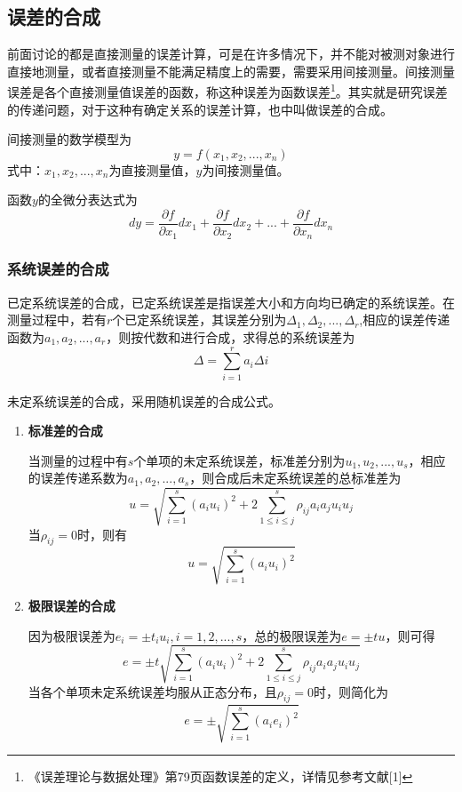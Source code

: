 \subsection{误差的合成}
前面讨论的都是直接测量的误差计算，可是在许多情况下，并不能对被测对象进行直接地测量，或者直接测量不能满足精度上的需要，需要采用间接测量。间接测量误差是各个直接测量值误差的函数，称这种误差为函数误差\footnote{《误差理论与数据处理》第79页函数误差的定义，详情见参考文献[1]}。其实就是研究误差的传递问题，对于这种有确定关系的误差计算，也中叫做误差的合成。

间接测量的数学模型为\begin{equation} y=f(x_1,x_2,...,x_n) \end{equation}
式中：$ x_1,x_2,...,x_n $为直接测量值，$ y $为间接测量值。

函数$ y $的全微分表达式为\begin{equation} dy=\frac{\partial f}{\partial x_1}dx_1+\frac{\partial f}{\partial x_2}dx_2+...+\frac{\partial f}{\partial x_n}dx_n \end{equation}
\subsubsection{系统误差的合成}
已定系统误差的合成，已定系统误差是指误差大小和方向均已确定的系统误差。在测量过程中，若有$ r $个已定系统误差，其误差分别为$ \Delta_1,\Delta_2,...,\Delta_r $,相应的误差传递函数为$ a_1,a_2,...,a_r $，则按代数和进行合成，求得总的系统误差为\begin{equation} \Delta=\sum_{i=1}^{r}a_i\Delta i \end{equation}

未定系统误差的合成，采用随机误差的合成公式。
\begin{enumerate}
	\item \textbf{标准差的合成}
	
	\qquad 当测量的过程中有$ s $个单项的未定系统误差，标准差分别为$ u_1,u_2,...,u_s $，相应的误差传递系数为$ a_1,a_2,...,a_s $，则合成后未定系统误差的总标准差为\begin{equation} u=\sqrt{\sum_{i=1}^{s}(a_iu_i)^2+2\sum_{1\leq i\leq j}^{s}\rho_{ij}a_ia_ju_iu_j} \end{equation}
	当$ \rho_{ij}=0 $时，则有\begin{equation} u=\sqrt{\sum_{i=1}^{s}(a_iu_i)^2} \end{equation}
	\item \textbf{极限误差的合成}
	
	\qquad 因为极限误差为$ e_i=\pm t_iu_i,i=1,2,...,s $，总的极限误差为$ e=\pm tu $，则可得\begin{equation} e=\pm t\sqrt{\sum_{i=1}^{s}(a_iu_i)^2+2\sum_{1\leq i\leq j}^{s}\rho_{ij}a_ia_ju_iu_j} \end{equation}
	当各个单项未定系统误差均服从正态分布，且$ \rho_{ij}=0 $时，则简化为\begin{equation} e=\pm\sqrt{\sum_{i=1}^{s}(a_ie_i)^2} \end{equation}
\end{enumerate}
